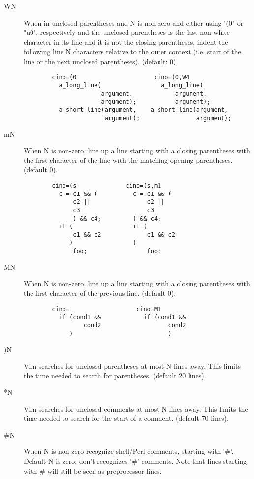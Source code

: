 \begin{description}
\begin{verbatim}
 \end{verbatim}
    \item[WN] When in unclosed parentheses and N is non-zero and either
          using "(0" or "u0", respectively and the unclosed parentheses is
          the last non-white character in its line and it is not the
          closing parentheses, indent the following line N characters
          relative to the outer context (i.e. start of the line or the
          next unclosed parentheses).  (default: 0).
\begin{verbatim}
        cino=(0                      cino=(0,W4
          a_long_line(                 a_long_line(
                      argument,            argument,
                      argument);           argument);
          a_short_line(argument,    a_short_line(argument,
                       argument);                argument);
 \end{verbatim}
 \clearpage
    \item[mN] When N is non-zero, line up a line starting with a closing
          parentheses with the first character of the line with the
          matching opening parentheses.  (default 0).
\begin{verbatim}
        cino=(s              cino=(s,m1
          c = c1 && (          c = c1 && (
              c2 ||                c2 ||
              c3                   c3
              ) && c4;         ) && c4;
          if (                 if (
              c1 && c2             c1 && c2
             )                 )
              foo;                 foo;
 \end{verbatim}
    \item[MN] When N is non-zero, line up a line starting with a closing
          parentheses with the first character of the previous line.
          (default 0).
\begin{verbatim}
        cino=                   cino=M1
          if (cond1 &&            if (cond1 &&
                 cond2                   cond2
             )                           )
 \end{verbatim}
 
    \item[)N] Vim searches for unclosed parentheses at most N lines away.
          This limits the time needed to search for parentheses.  (default
          20 lines).

    \item[*N]    Vim searches for unclosed comments at most N lines away.  This
          limits the time needed to search for the start of a comment.
          (default 70 lines).

    \item[\#N]    When N is non-zero recognize shell/Perl comments, starting with
          '\#'.  Default N is zero: don't recognizes '\#' comments.  Note
          that lines starting with \# will still be seen as preprocessor
          lines.

\end{description}
